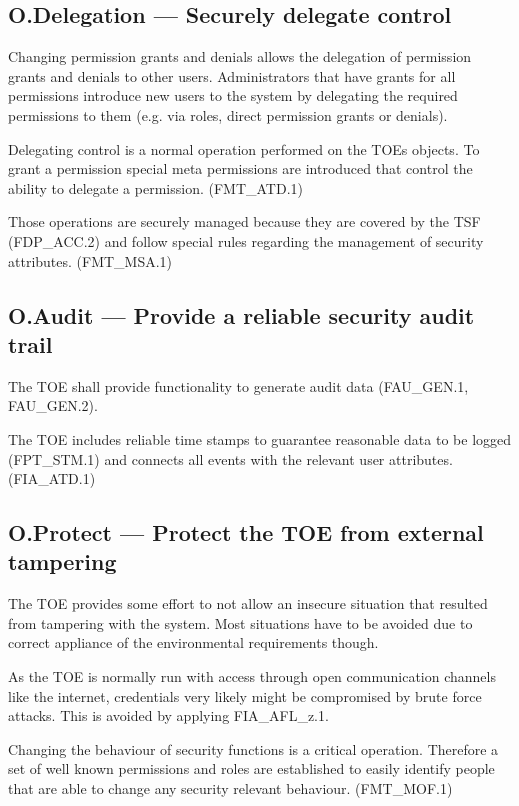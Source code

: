 \documentclass[12pt,english]{scrbook}
\begin{document}
\subsection{O.Delegation  --- Securely delegate control}

    Changing permission grants and denials allows the delegation of permission
    grants and denials to other users. Administrators that have grants for all
    permissions introduce new users to the system by delegating the required
    permissions to them (e.g. via roles, direct permission grants or denials).

    Delegating control is a normal operation performed on the TOEs objects. To
    grant a permission special meta permissions are introduced that control the
    ability to delegate a permission. (FMT\_ATD.1)

    Those operations are securely managed because they are covered by the TSF
    (FDP\_ACC.2) and follow special rules regarding the management of security
    attributes. (FMT\_MSA.1)

\subsection{O.Audit --- Provide a reliable security audit trail}

    The TOE shall provide functionality to generate audit data (FAU\_GEN.1,
    FAU\_GEN.2).

    The TOE includes reliable time stamps to guarantee reasonable data to be
    logged (FPT\_STM.1) and connects all events with the relevant user
    attributes. (FIA\_ATD.1)

\subsection{O.Protect --- Protect the TOE from external tampering}

    The TOE provides some effort to not allow an insecure situation that
    resulted from tampering with the system. Most situations have to be avoided
    due to correct appliance of the environmental requirements though.

    As the TOE is normally run with access through open communication channels
    like the internet, credentials very likely might be compromised by brute
    force attacks. This is avoided by applying FIA\_AFL\_z.1.

    Changing the behaviour of security functions is a critical operation.
    Therefore a set of well known permissions and roles are established to
    easily identify people that are able to change any security relevant
    behaviour. (FMT\_MOF.1)
    
\end{document}
